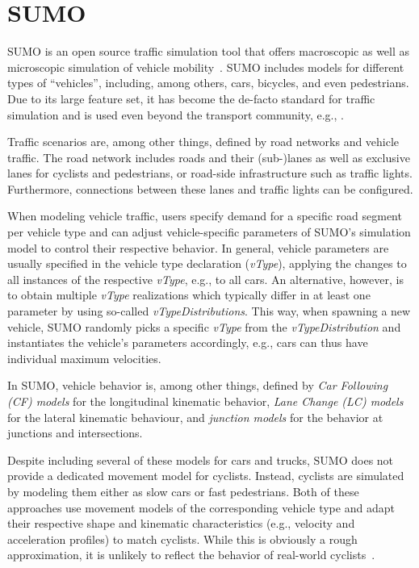 \section{SUMO}
\label{sec:sumo_background}
SUMO is an open source traffic simulation tool that offers macroscopic as well as microscopic simulation of vehicle mobility~\cite{lopez2018microscopic}.
SUMO includes models for different types of ``vehicles'', including, among others, cars, bicycles, and even pedestrians.
Due to its large feature set, it has become the de-facto standard for traffic simulation and is used even beyond the transport community, e.g., \cite{beilharz2021towards}.

Traffic scenarios are, among other things, defined by road networks and vehicle traffic.
The road network includes roads and their (sub-)lanes as well as exclusive lanes for cyclists and pedestrians, or road-side infrastructure such as traffic lights.
Furthermore, connections between these lanes and traffic lights can be configured.

When modeling vehicle traffic, users specify demand for a specific road segment per vehicle type and can adjust vehicle-specific parameters of SUMO's simulation model to control their respective behavior.
In general, vehicle parameters are usually specified in the vehicle type declaration (\textit{vType}), applying the changes to all instances of the respective \textit{vType}, e.g., to all cars.
An alternative, however, is to obtain multiple \textit{vType} realizations which typically differ in at least one parameter by using so-called \textit{vTypeDistributions}.
This way, when spawning a new vehicle, SUMO randomly picks a specific \textit{vType} from the \textit{vTypeDistribution} and instantiates the vehicle's parameters accordingly, e.g., cars can thus have individual maximum velocities.

In SUMO, vehicle behavior is, among other things, defined by
\textit{Car Following (CF) models} for the longitudinal kinematic behavior,
\textit{Lane Change (LC) models} for the lateral kinematic behaviour,
and \textit{junction models} for the behavior at junctions and intersections.

Despite including several of these models for cars and trucks, SUMO does not provide a dedicated movement model for cyclists.
Instead, cyclists are simulated by modeling them either as slow cars or fast pedestrians.
Both of these approaches use movement models of the corresponding vehicle type and adapt their respective shape and kinematic characteristics (e.g., velocity and acceleration profiles) to match cyclists.
While this is obviously a rough approximation, it is unlikely to reflect the behavior of real-world cyclists~\cite{grigoropoulos2019modelling}.

